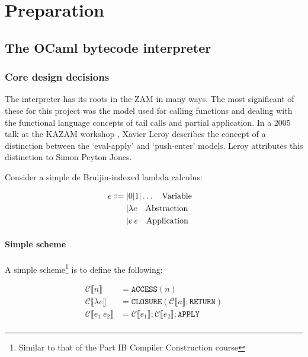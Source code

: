\chapter{Preparation}

\section{The OCaml bytecode interpreter}

\subsection{Core design decisions}

The interpreter has its roots in the ZAM\cite{zinc} in many ways. The most significant of these for
this project was the model used for calling functions and dealing with the functional language
concepts of tail calls and partial application. In a 2005 talk at the KAZAM workshop
\cite{xavtalk}, Xavier Leroy describes the concept
of a distinction between the `eval-apply' and `push-enter' models. Leroy attributes this
distinction to Simon Peyton Jones.

Consider a simple de Bruijin-indexed lambda calculus:

\begin{align*}
    e \Coloneqq | & 0 | 1 | \ldots \qq{Variable} \\
    |             & \lambda e \qq{Abstraction}   \\
    |             & e\: e \qq{Application}       \\
\end{align*}

\subsubsection{Simple scheme}

A simple scheme\footnote{Similar to that of the Part IB Compiler Construction course} is to define
the following:

\newcommand{\compile}[1]{\ensuremath{\mathcal{C}\llbracket #1 \rrbracket}}

\begin{align*}
    \compile{n}          & = \texttt{ACCESS}(n)                             \\
    \compile{\lambda e}  & = \texttt{CLOSURE}(\compile{a}; \texttt{RETURN}) \\
    \compile{e_1 \: e_2} & = \compile{e_1}; \compile{e_2}; \texttt{APPLY}   \\
\end{align*}

